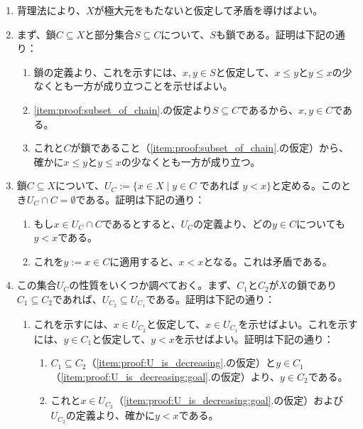 ﻿\documentclass{ltjsarticle}
\theoremstyle{definition}
\begin{document}
\begin{enumerate}
    \item \label{item:proof:contraposition} 背理法により、$X$が極大元をもたないと仮定して矛盾を導けばよい。
    \item \label{item:proof:subset_of_chain} まず、鎖$C \subseteq X$と部分集合$S \subseteq C$について、$S$も鎖である。証明は下記の通り：
    \begin{enumerate}
        \item 鎖の定義より、これを示すには、$x,y \in S$と仮定して、$x \leq y$と$y \leq x$の少なくとも一方が成り立つことを示せばよい。
        \item \ref{item:proof:subset_of_chain}.の仮定より$S \subseteq C$であるから、$x,y \in C$である。
        \item これと$C$が鎖であること（\ref{item:proof:subset_of_chain}.の仮定）から、確かに$x \leq y$と$y \leq x$の少なくとも一方が成り立つ。
    \end{enumerate}
    \item \label{item:proof:definition_of_U} 鎖$C \subseteq X$について、$U_C := \{ x \in X \mid y \in C \mbox{ であれば } y < x \}$と定める。このとき$U_C \cap C = \emptyset$である。証明は下記の通り：
    \begin{enumerate}
        \item もし$x \in U_C \cap C$であるとすると、$U_C$の定義より、どの$y \in C$についても$y < x$である。
        \item これを$y := x \in C$に適用すると、$x < x$となる。これは矛盾である。
    \end{enumerate}
    \item \label{item:proof:U_is_decreasing} この集合$U_C$の性質をいくつか調べておく。まず、$C_1$と$C_2$が$X$の鎖であり$C_1 \subseteq C_2$であれば、$U_{C_2} \subseteq U_{C_1}$である。証明は下記の通り：
    \begin{enumerate}
        \item \label{item:proof:U_is_decreasing:goal} これを示すには、$x \in U_{C_2}$と仮定して、$x \in U_{C_1}$を示せばよい。これを示すには、$y \in C_1$と仮定して、$y < x$を示せばよい。証明は下記の通り：
        \begin{enumerate}
            \item \label{item:proof:U_is_decreasing:C_1_is_in_C_2} $C_1 \subseteq C_2$（\ref{item:proof:U_is_decreasing}.の仮定）と$y \in C_1$（\ref{item:proof:U_is_decreasing:goal}.の仮定）より、$y \in C_2$である。
            \item これと$x \in U_{C_2}$（\ref{item:proof:U_is_decreasing:goal}.の仮定）および$U_{C_2}$の定義より、確かに$y < x$である。

\end{enumerate}
\end{enumerate}
\end{enumerate}
\end{document}
